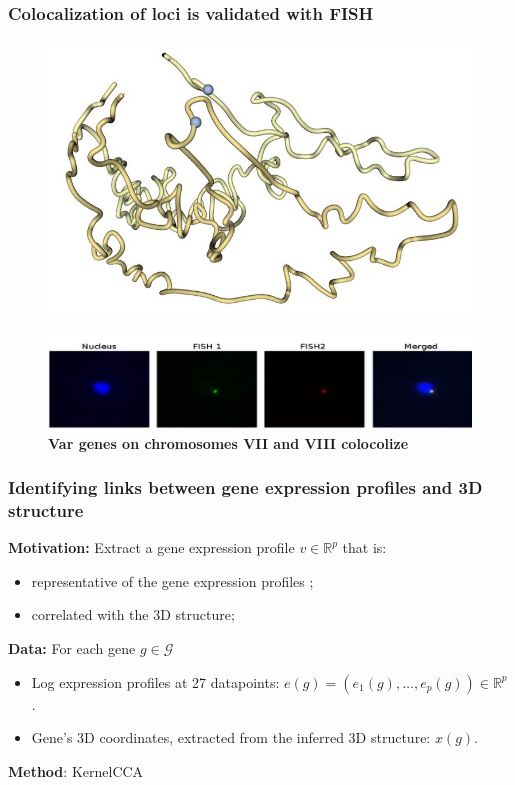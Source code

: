 \documentclass[11pt,xcolor=dvipsnames]{beamer}
\begin{document}
  \begin{frame}
  \frametitle{Colocalization of loci is validated with FISH}
  \begin{figure}
  \includegraphics[scale=0.2]{figures/3D_FISH_1.jpg}
  \end{figure}
  \begin{figure}
  \includegraphics[scale=0.45]{figures/FISH_1.jpg}
  \caption{\textbf{Var genes on chromosomes VII and VIII colocolize}
  }
  \end{figure}
  \end{frame}
  
\begin{frame}
  \frametitle{Identifying links between gene expression profiles and 3D structure}
  {\color{Blue} \textbf{Motivation:}} Extract a gene expression profile
  $v \in \mathbb{R}^p$ that is:
  \begin{itemize}[label={$\bullet$}]

  \item representative of the gene expression profiles ;
  \item correlated with the 3D structure;
  \end{itemize}
  \vspace{1em}
  {\color{Blue} \textbf{Data:}}
  For each gene $g \in \mathcal{G}$
  \begin{itemize}[label={$\bullet$}]
\item Log expression profiles at 27 datapoints: $e(g) = \left( e_1(g), \ldots, e_p(g)\right) \in \mathbb{R}^p$ .
  \item Gene's 3D coordinates, extracted from the inferred 3D structure: $x(g)$.
  \end{itemize}
  \vspace{1em}
  {\color{Blue} \textbf{Method}:}
   KernelCCA \citep{vert:graph, bach:kernel}

  \end{frame}
\end{document}
